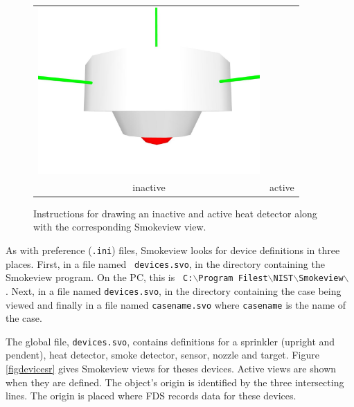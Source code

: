 \documentclass[11pt,twoside]{book}
\newcommand{\figoptions}{hbp}
\newcommand{\figheightA}{2.5in}
\begin{document}
\begin{figure}[\figoptions]
\begin{center}
\begin{tabular}{cc}
 \includegraphics[height=\figheightA]{figures/heatdetector_act}\\
inactive&active\\
 \end{tabular}
 \end{center}
\caption{Instructions for drawing an inactive and active heat detector
along with the corresponding Smokeview view.}
\label{figsprinkler}%
\end{figure}


\newcommand{\devfig}[1]{
\texttt{[image: figures/\#1]}
}

As with preference ({\tt .ini}) files, Smokeview looks for device
definitions in three places.  First, in a file named {\tt
devices.svo}, in the directory containing the Smokeview program.
On the PC, this is {\tt
C:$\backslash$Program Filest$\backslash$NIST$\backslash$Smokeview$\backslash$} . Next, in a file
named {\tt devices.svo}, in the directory containing the case
being viewed and finally in a file named {\tt casename.svo} where
{\tt casename} is the name of the case.

The global file, {\tt devices.svo}, contains definitions for a
sprinkler (upright and pendent), heat detector, smoke detector,
sensor, nozzle and target.  Figure \ref{figdevicesr} gives Smokeview views
for theses devices.  Active views are shown when they are defined.
The object's origin is identified by the three intersecting lines.
The origin is placed where FDS records data for these devices.
\end{document}
